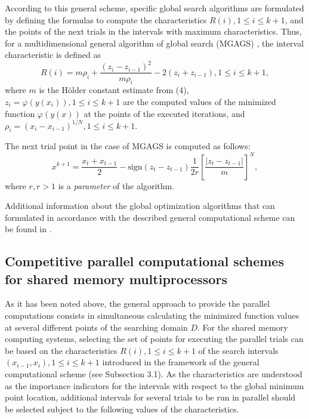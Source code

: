 \documentclass[
11pt,%
tightenlines,%
twoside,%
onecolumn,%
nofloats,%
nobibnotes,%
nofootinbib,%
superscriptaddress,%
noshowpacs,%
centertags]%
{revtex4}
\begin{document}
According to this general scheme, specific global search algorithms are formulated by defining the formulas to compute the characteristics $R(i), 1 \leq i \leq k+1$, and the points of the next trials in the intervals with maximum characteristics. Thus, for a multidimensional general algorithm of global search (MGAGS) \cite{Strongin1}, the interval characteristic is defined as
\begin{equation}
R(i)=m\rho_i+\frac{(z_i-z_{i-1})^2}{m\rho_i}-2 (z_i + z_{i-1}), 1 \leq i \leq k + 1,
\end{equation}
where $m$ is the H\"older constant estimate from (4), $z_i = \varphi(y(x_i)), 1 \leq i \leq k + 1$ are the computed values of the minimized function $\varphi(y(x))$ at the points of the executed iterations, and $\rho_i = \left(x_i - x_{i-1} \right)^{1/N}, 1 \leq i \leq k + 1$.

The next trial point in the case of MGAGS is computed as follows:
\begin{equation}
x^{k+1} = \frac{x_t+x_{t-1}}{2} - \mathrm{sign}(z_t-z_{t-1})\frac{1}{2r}\left[\frac{\left|z_t-z_{t-1}\right|}{m}\right]^N,
\end{equation}
where $r, r > 1$ is a \textit{parameter} of the algorithm.

Additional information about the global optimization algorithms that can formulated in accordance with the described general computational scheme can be found in \cite{Strongin1, Strongin2}.


\subsection{Competitive parallel computational schemes for shared memory multiprocessors}

As it has been noted above, the general approach to provide the parallel computations consists in simultaneous calculating the minimized function values at several different points of the searching domain $D$. For the shared memory computing systems, selecting the set of points for executing the parallel trials can be based on the characteristics $R(i), 1 \leq i \leq k + 1$ of the search intervals $(x_{i-1} ,x_i), 1 \leq i \leq k + 1$ introduced in the framework of the general computational scheme (see Subsection 3.1). As the characteristics are understood as the importance indicators for the intervals with respect to the global minimum point location, additional intervals for several trials to be run in parallel should be selected subject to the following values of the characteristics.
\end{document}
